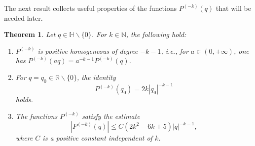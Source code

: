 \documentclass[reqno,11pt]{amsart}
\newtheorem{theorem}{Theorem}[section]
\theoremstyle{definition}
\begin{document}
The next result collects useful properties of the functions $P^{(-k)}(q)$ that will be needed later.
\begin{theorem}\label{STIMAPk-1}
	Let $q \in \mathbb{H} \backslash \{0\}$. For $k \in \mathbb{N}$, the following hold:
	\begin{enumerate}[label=\textnormal{(\roman{*})}]
		\item $P^{(-k)}$ is positive homogeneous of degree $-k-1$, i.e., for $a\in (0,+\infty)$, one has $P^{(-k)}(aq)=a^{-k-1}P^{(-k)}(q)$.
		\item For $q=q_0\in \mathbb{R}\backslash \{0\}$, the identity
		\[
		P^{(-k)}(q_0)=2k |q_0|^{-k-1}
		\]
		holds.
		\item The functions $P^{(-k)}$  satisfy the estimate
		\begin{equation}
			\label{est00}
			|P^{(-k)}(q)| \leq C (2k^2-6k+5)|q|^{-k-1},
		\end{equation}
		where $C$ is a positive constant independent of $k$.
	\end{enumerate}
\end{theorem}
\end{document}

